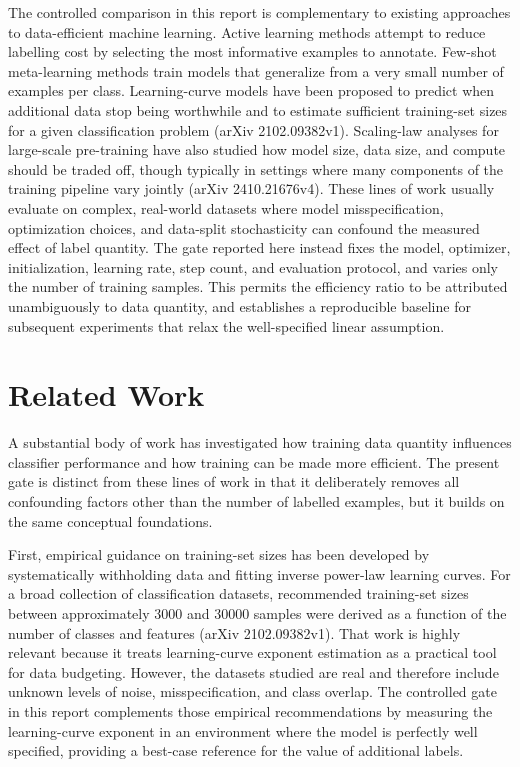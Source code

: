 \documentclass[10pt]{article}
\begin{document}
The controlled comparison in this report is complementary to existing approaches to data-efficient machine learning. Active learning methods attempt to reduce labelling cost by selecting the most informative examples to annotate. Few-shot meta-learning methods train models that generalize from a very small number of examples per class. Learning-curve models have been proposed to predict when additional data stop being worthwhile and to estimate sufficient training-set sizes for a given classification problem (arXiv 2102.09382v1). Scaling-law analyses for large-scale pre-training have also studied how model size, data size, and compute should be traded off, though typically in settings where many components of the training pipeline vary jointly (arXiv 2410.21676v4). These lines of work usually evaluate on complex, real-world datasets where model misspecification, optimization choices, and data-split stochasticity can confound the measured effect of label quantity. The gate reported here instead fixes the model, optimizer, initialization, learning rate, step count, and evaluation protocol, and varies only the number of training samples. This permits the efficiency ratio to be attributed unambiguously to data quantity, and establishes a reproducible baseline for subsequent experiments that relax the well-specified linear assumption.

\section{Related Work}
A substantial body of work has investigated how training data quantity influences classifier performance and how training can be made more efficient. The present gate is distinct from these lines of work in that it deliberately removes all confounding factors other than the number of labelled examples, but it builds on the same conceptual foundations.

First, empirical guidance on training-set sizes has been developed by systematically withholding data and fitting inverse power-law learning curves. For a broad collection of classification datasets, recommended training-set sizes between approximately 3000 and 30000 samples were derived as a function of the number of classes and features (arXiv 2102.09382v1). That work is highly relevant because it treats learning-curve exponent estimation as a practical tool for data budgeting. However, the datasets studied are real and therefore include unknown levels of noise, misspecification, and class overlap. The controlled gate in this report complements those empirical recommendations by measuring the learning-curve exponent in an environment where the model is perfectly well specified, providing a best-case reference for the value of additional labels.
\end{document}
